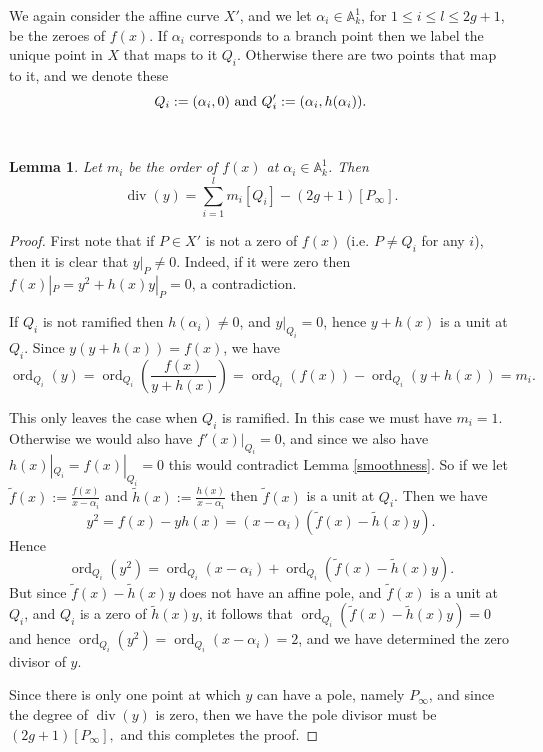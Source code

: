 \documentclass[draft, 11pt]{article} %
\theoremstyle{plain}
\newtheorem{lem}[defn]{Lemma}
\theoremstyle{remark}
\DeclareMathOperator{\ord}{ord}
\DeclareMathOperator{\di}{div}
\begin{document}
We again consider the affine curve $X'$, and we let $\alpha_i \in \mathbb A_k^1$, for $1\leq i\leq l \leq 2g+1$, be the zeroes of $f(x)$.
If $\alpha_i$ corresponds to a branch point then we label the unique point in $X$ that maps to it $Q_i$.
Otherwise there are two points that map to it, and we denote these \[ Q_i:=(\alpha_i,0)\ {\rm and}\ Q_i':=(\alpha_i,h(\alpha_i)).\]


~


\begin{lem}\label{ychar2}
 Let $m_i$ be the order of $f(x)$ at $\alpha_i\in \mathbb A_k^1$.
 Then 
 \[
  \di(y) = \sum_{i=1}^l m_i[Q_i] - (2g+1)[P_\infty].
 \]

\end{lem}
\begin{proof}
 First note that if $P\in X'$ is not a zero of $f(x)$ (i.e. $P\neq Q_i$ for any $i$), then it is clear that $y|_P \neq 0$.
 Indeed, if it were zero then $f(x)|_P = y^2 + h(x)y|_P = 0$, a contradiction.
 
 If $Q_i$ is not ramified then $h(\alpha_i) \neq 0$, and $y|_{Q_i} = 0$, hence $y+h(x)$ is a unit at $Q_i$.
 Since $y(y+h(x)) = f(x)$, we have
 \[
  \ord_{Q_i}(y) = \ord_{Q_i}\left(\frac{f(x)}{y+h(x)}\right) = \ord_{Q_i}(f(x)) -\ord_{Q_i}(y+h(x)) = m_i.
 \]

 This only leaves the case when $Q_i$ is ramified. 
 In this case we must have $m_i=1$.
 Otherwise we would also have $f'(x)|_{Q_i} = 0$, and since we also have $h(x)|_{Q_i} = f(x)|_{Q_i} = 0$ this would contradict Lemma \ref{smoothness}.
 So if we let $\tilde f(x) := \frac{f(x)}{x-\alpha_i}$ and $\tilde h(x) := \frac{h(x)}{x-\alpha_i}$ then $\tilde f(x)$ is a unit at $Q_i$.
 Then we have \[y^2 = f(x) - yh(x) = (x-\alpha_i)(\tilde f(x) - \tilde h(x)y).\]
 Hence
 \[
  \ord_{Q_i}(y^2) = \ord_{Q_i}(x-\alpha_i) + \ord_{Q_i}(\tilde f(x) - \tilde h(x)y).
 \]
But since $\tilde f(x) - \tilde h(x) y$ does not have an affine pole, and $\tilde f(x)$ is a unit at $Q_i$, and $Q_i$ is a zero of $\tilde h(x) y$, it follows that $\ord_{Q_i}(\tilde f(x) -  \tilde h(x) y) = 0$
and hence $\ord_{Q_i}(y^2) = \ord_{Q_i}(x-\alpha_i) = 2$, and we have determined the zero divisor of $y$.

Since there is only one point at which $y$ can have a pole, namely $P_\infty$, and since the degree of $\di (y)$ is zero, then we have the pole divisor must be
$
 (2g+1)[P_\infty],
$
and this completes the proof.
\end{proof}
\end{document}
